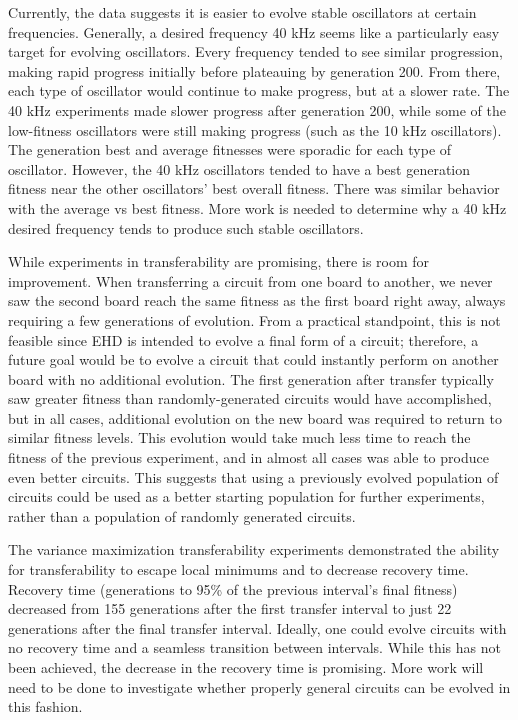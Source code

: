 \documentclass{ieeeaccess}
\newcommand{\highlight}[1]{#1}
\begin{document}
Currently, the data suggests it is easier to evolve stable oscillators at certain frequencies.
Generally, a desired frequency 40 kHz seems like a particularly easy target for evolving oscillators. Every frequency tended to see similar progression, making rapid progress initially before plateauing by generation 200. From there, each type of oscillator would continue to make progress, but at a slower rate. The 40 kHz experiments made slower progress after generation 200, while some of the low-fitness oscillators were still making progress (such as the 10 kHz oscillators). The generation best and average fitnesses were sporadic for each type of oscillator. However, the 40 kHz oscillators tended to have a best generation fitness near the other oscillators' best overall fitness. There was similar behavior with the average vs best fitness. More work is needed to determine why a 40 kHz desired frequency tends to produce such stable oscillators.


While experiments in transferability are promising, there is room for improvement. When transferring a circuit from one board to another, we never saw the second board reach the same fitness as the first board right away, always requiring a few generations of evolution. \highlight{From a practical standpoint, this is not feasible since EHD is intended to evolve a final form of a circuit; therefore, a future goal would be to evolve a circuit that could instantly perform on another board with no additional evolution.} The first generation after transfer typically saw greater fitness than randomly-generated circuits would have accomplished, but in all cases, additional evolution on the new board was required to return to similar fitness levels. This evolution would take much less time to reach the fitness of the previous experiment, and in almost all cases was able to produce even better circuits. This suggests that using a previously evolved population of circuits could be used as a better starting population for further experiments, rather than a population of randomly generated circuits. 


The variance maximization transferability experiments demonstrated the ability for transferability to escape local minimums and to decrease recovery time. Recovery time (generations to 95\% of the previous interval's final fitness) decreased from 155 generations after the first transfer interval to just 22 generations after the final transfer interval. Ideally, one could evolve circuits with no recovery time and a seamless transition between intervals. While this has not been achieved, the decrease in the recovery time is promising. More work will need to be done to investigate whether properly general circuits can be evolved in this fashion.
\end{document}
